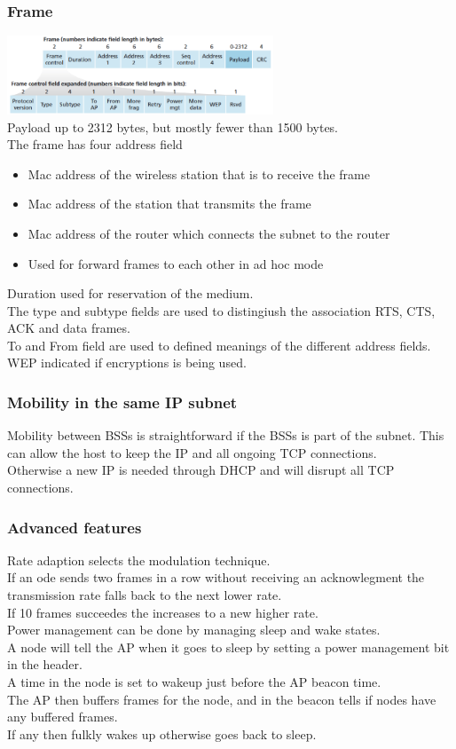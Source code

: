 \documentclass[12pt, a4paper]{article}
\begin{document}
		\subsubsection{Frame}
			\includegraphics[width=300px]{assets/wifiFrame.png}\\
			Payload up to 2312 bytes, but mostly fewer than 1500 bytes.\\
			The frame has four address field
			\begin{itemize}
				\item Mac address of the wireless station that is to receive the frame
				\item Mac address of the station that transmits the frame
				\item Mac address of the router which connects the subnet to the router
				\item Used for forward frames to each other in ad hoc mode
			\end{itemize}
			Duration used for reservation of the medium.\\
			The type and subtype fields are used to distingiush the association RTS, CTS, ACK and data frames.\\
			To and From field are used to defined meanings of the different address fields.\\
			WEP indicated if encryptions is being used.
		\subsubsection{Mobility in the same IP subnet}
			Mobility between BSSs is straightforward if the BSSs is part of the subnet.
			This can allow the host to keep the IP and all ongoing TCP connections.\\
			Otherwise a new IP is needed through DHCP and will disrupt all TCP connections.\\
		\subsubsection{Advanced features}
			Rate adaption selects the modulation technique.\\
			If an ode sends two frames in a row without receiving an acknowlegment the transmission rate falls back to the next lower rate.\\
			If 10 frames succeedes the increases to a new higher rate.\\
			Power management can be done by managing sleep and wake states.\\
			A node will tell the AP when it goes to sleep by setting a power management bit in the header.\\
			A time in the node is set to wakeup just before the AP beacon time.\\
			The AP then buffers frames for the node, and in the beacon tells if nodes have any buffered frames.\\
			If any then fulkly wakes up otherwise goes back to sleep.\\
\end{document}
